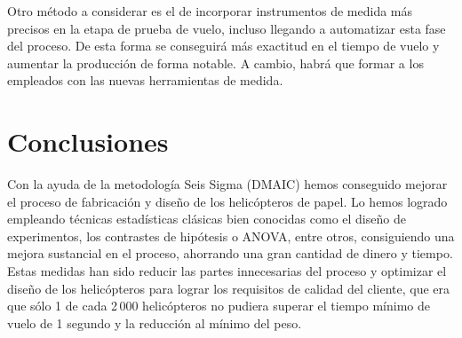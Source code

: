 \documentclass[12pt,a4paper,twoside,openright,titlepage,final]{article}
\begin{document}
Otro método a considerar es el de incorporar instrumentos de medida más precisos en la etapa de prueba de vuelo, incluso llegando a automatizar esta fase del proceso. De esta forma se conseguirá más exactitud en el tiempo de vuelo y aumentar la producción de forma notable. A cambio, habrá que formar a los empleados con las nuevas herramientas de medida.

\section{Conclusiones}

Con la ayuda de la metodología Seis Sigma (DMAIC) hemos conseguido mejorar el proceso de fabricación y diseño de los helicópteros de papel. Lo hemos logrado empleando técnicas estadísticas clásicas bien conocidas como el diseño de experimentos, los contrastes de hipótesis o ANOVA, entre otros, consiguiendo una mejora sustancial en el proceso, ahorrando una gran cantidad de dinero y tiempo. Estas medidas han sido reducir las partes innecesarias del proceso y optimizar el diseño de los helicópteros para lograr los requisitos de calidad del cliente, que era que sólo 1 de cada 2\,000 helicópteros no pudiera superar el tiempo mínimo de vuelo de 1 segundo y la reducción al mínimo del peso. 



\end{document}

